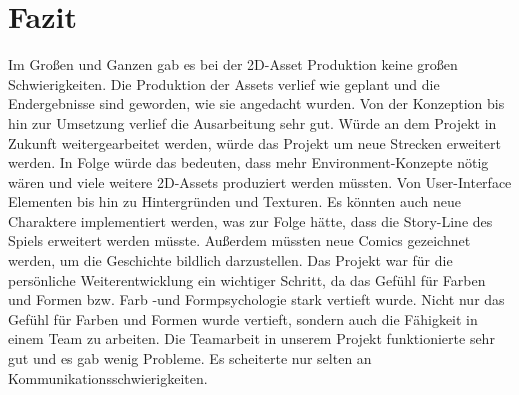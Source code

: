 \section{Fazit}
Im Großen und Ganzen gab es bei der 2D-Asset Produktion keine großen Schwierigkeiten. Die Produktion der Assets verlief wie geplant und die Endergebnisse sind geworden, wie sie angedacht wurden. Von der Konzeption bis hin zur Umsetzung verlief die Ausarbeitung sehr gut. 
Würde an dem Projekt in Zukunft weitergearbeitet werden, würde das Projekt um neue Strecken erweitert werden. In Folge würde das bedeuten, dass mehr Environment-Konzepte nötig wären und viele weitere 2D-Assets produziert werden müssten. Von User-Interface Elementen bis hin zu Hintergründen und Texturen. Es könnten auch neue Charaktere implementiert werden, was zur Folge hätte, dass die Story-Line des Spiels erweitert werden müsste. Außerdem müssten neue Comics gezeichnet werden, um die Geschichte bildlich darzustellen. 
Das Projekt war für die persönliche Weiterentwicklung ein wichtiger Schritt, da das Gefühl für Farben und Formen bzw. Farb -und Formpsychologie stark vertieft wurde. Nicht nur das Gefühl für Farben und Formen wurde vertieft, sondern auch die Fähigkeit in einem Team zu arbeiten. Die Teamarbeit in unserem Projekt funktionierte sehr gut und es gab wenig Probleme. Es scheiterte nur selten an Kommunikationsschwierigkeiten. 





